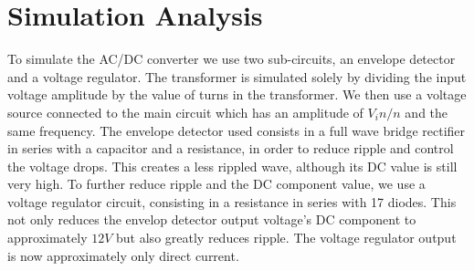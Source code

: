 \section{Simulation Analysis}
\label{sec:simulation}

To simulate the AC/DC converter we use two sub-circuits, an envelope detector and a voltage regulator.
The transformer is simulated solely by dividing the input voltage amplitude by the value of turns in the transformer. We then use a voltage source connected to the main circuit which has an amplitude of $V_in/n$ and the same frequency.
The envelope detector used consists in a full wave bridge rectifier in series with a capacitor and a resistance, in order to reduce ripple and control the voltage drops. This creates a less rippled wave, although its DC value is still very high.
To further reduce ripple and the DC component value, we use a voltage regulator circuit, consisting in a resistance in series with 17 diodes.
This not only reduces the envelop detector output voltage's DC component to approximately $12V$ but also greatly reduces ripple.
The voltage regulator output is now approximately only direct current.

